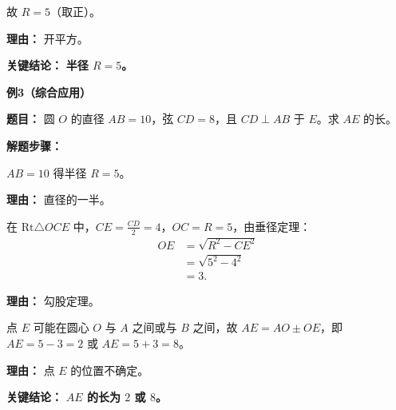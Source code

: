 \begin{examplebox}
\begin{description}[style=nextline, leftmargin=2.8em, labelsep=0.5em, itemsep=0.45em]
		\item[\textbf{第三步（求半径）：}] 故 $R = 5$（取正）。
			\par\textbf{理由：} 开平方。
	\end{description}

	\textbf{\textcolor{CExample}{关键结论：}}
	\textbf{半径 $R=5$。}

	\medskip
	\textbf{\textcolor{CExample}{例3（综合应用）}}

	\textbf{\textcolor{CExample}{题目：}}
	圆 $O$ 的直径 $AB=10$，弦 $CD=8$，且 $CD\perp AB$ 于 $E$。求 $AE$ 的长。

	\textbf{\textcolor{CExample}{解题步骤：}}
	\begin{description}[style=nextline, leftmargin=2.8em, labelsep=0.5em, itemsep=0.45em]
		\item[\textbf{第一步（得半径）：}] $AB=10$ 得半径 $R=5$。
			\par\textbf{理由：} 直径的一半。

		\item[\textbf{第二步（求弦心距）：}] 在 $\mathrm{Rt}\triangle OCE$ 中，$CE=\frac{CD}{2}=4$，$OC=R=5$，由垂径定理：
			\[
				\begin{aligned}
					OE &= \sqrt{R^2 - CE^2} \\
					&= \sqrt{5^2-4^2} \\
					&= 3.
			\end{aligned}
			\]
			\par\textbf{理由：} 勾股定理。

		\item[\textbf{第三步（求 $AE$）：}] 点 $E$ 可能在圆心 $O$ 与 $A$ 之间或与 $B$ 之间，故 $AE = AO \pm OE$，即 $AE=5-3=2$ 或 $AE=5+3=8$。
			\par\textbf{理由：} 点 $E$ 的位置不确定。
	\end{description}

	\textbf{\textcolor{CExample}{关键结论：}}
	\textbf{$AE$ 的长为 $2$ 或 $8$。}
\end{examplebox}
